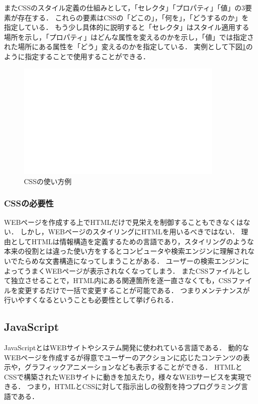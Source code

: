 \documentclass[12pt,a4j]{ltjsarticle}
\begin{document}
またCSSのスタイル定義の仕組みとして，「セレクタ」「プロパティ」「値」の3要素が存在する．
これらの要素はCSSの「どこの」，「何を」，「どうするのか」を指定している．
もう少し具体的に説明すると「セレクタ」はスタイル適用する場所を示し，「プロパティ」はどんな属性を変えるのかを示し，「値」では指定された場所にある属性を「どう」変えるのかを指定している．
実例として下図\ref{fig:CSS_ex}のように指定することで使用することができる．
\begin{figure}[h]
\begin{center}
\includegraphics[width = 100mm ] {figures/figure_sample.pdf}
\caption{CSSの使い方例}
\end{center}
\label{fig:CSS_ex}
\end{figure}

\clearpage

\subsubsection{CSSの必要性}
WEBページを作成する上でHTMLだけで見栄えを制御することもできなくはない．
しかし，WEBページのスタイリングにHTMLを用いるべきではない．
理由としてHTMLは情報構造を定義するための言語であり，スタイリングのような本来の役割とは違った使い方をするとコンピュータや検索エンジンに理解されないでたらめな文書構造になってしまうことがある．
ユーザーの検索エンジンによってうまくWEBページが表示されなくなってしまう．
またCSSファイルとして独立させることで，HTML内にある関連箇所を逐一直さなくても，CSSファイルを変更するだけで一括で変更することが可能である．
つまりメンテナンスが行いやすくなるということも必要性として挙げられる\cite{css2}．

\clearpage

\subsection{JavaScript}
JavaScriptとはWEBサイトやシステム開発に使われている言語である\cite{js}．
動的なWEBページを作成するが得意でユーザーのアクションに応じたコンテンツの表示や，グラフィックアニメーションなども表示することができる．
HTMLとCSSで構築されたWEBサイトに動きを加えたり，様々なWEBサービスを実現できる．
つまり，HTMLとCSSに対して指示出しの役割を持つプログラミング言語である．
\end{document}
